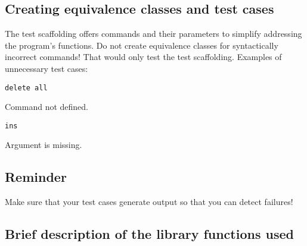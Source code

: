 \subsection*{Creating equivalence classes and test cases}

The test scaffolding offers commands and their parameters
to simplify addressing the program's functions.
Do not create equivalence classes for syntactically incorrect
commands!  That would only test the test scaffolding.
Examples of unnecessary test cases:
\begin{verbatim}
delete all
\end{verbatim}
Command not defined.
\begin{verbatim}
ins
\end{verbatim}
Argument is missing.

\subsection*{Reminder}

Make sure that your test cases generate output so that you can
detect failures!


\newpage
{}

\subsection*{Brief description of the library functions used}

